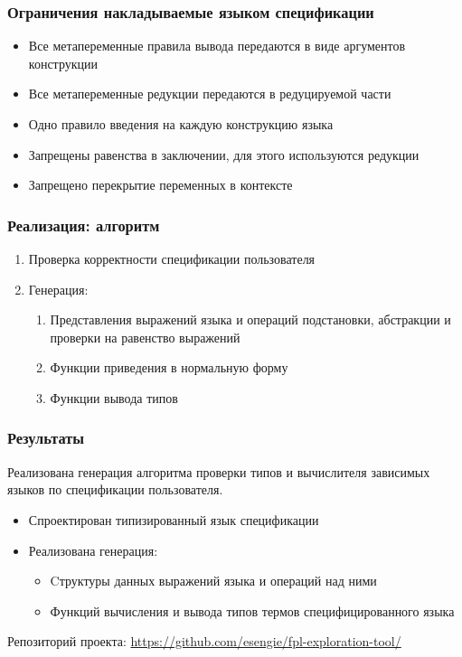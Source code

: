 \begin{frame}
\frametitle{Ограничения накладываемые языком спецификации}
\begin{itemize}
\item Все метапеременные правила вывода передаются в виде аргументов конструкции
\item Все метапеременные редукции передаются в редуцируемой части
\item Одно правило введения на каждую конструкцию языка
\item Запрещены равенства в заключении, для этого используются редукции
\item Запрещено перекрытие переменных в контексте
\end{itemize}
\end{frame}
\begin{frame}
\frametitle{Реализация: алгоритм}
\begin{enumerate}
\item Проверка корректности спецификации пользователя
\item Генерация:
\begin{enumerate}
\item Представления выражений языка и операций подстановки, абстракции и проверки на равенство выражений
\item Функции приведения в нормальную форму
\item Функции вывода типов
\end{enumerate}
\end{enumerate}
\end{frame}


\begin{frame}
\frametitle{Результаты}
Реализована генерация алгоритма проверки типов и вычислителя зависимых языков по спецификации пользователя.
\begin{itemize}
\item Спроектирован типизированный язык спецификации
\item Реализована генерация:
\begin{itemize}
\item Cтруктуры данных выражений языка и операций над ними
\item Функций вычисления и вывода типов термов специфицированного языка
\end{itemize}
\end{itemize}

Репозиторий проекта: \url{https://github.com/esengie/fpl-exploration-tool/}
\end{frame}

